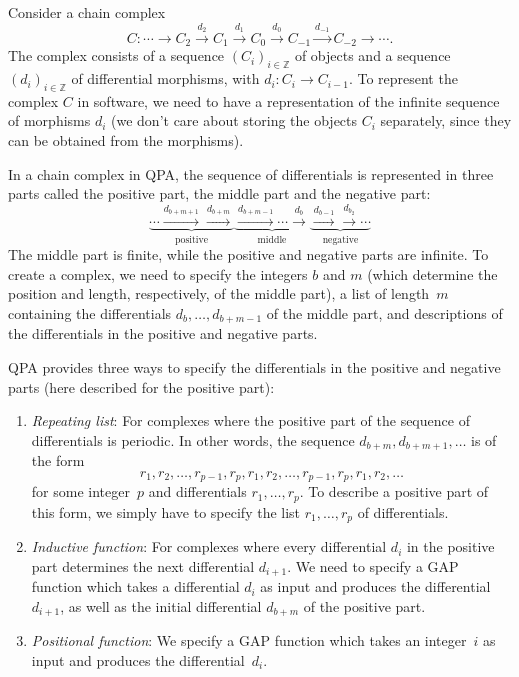 \documentclass{amsart}
\newcommand{\Z}{{\mathbb Z}}
\theoremstyle{definition}
\theoremstyle{theoretic}
\begin{document}
Consider a chain complex
\[
C \colon \cdots \to
 C_2 \xrightarrow{d_2}
 C_1 \xrightarrow{d_1}
 C_0 \xrightarrow{d_0}
 C_{-1} \xrightarrow{d_{-1}}
 C_{-2} \to \cdots.
\]
The complex consists of a sequence $(C_i)_{i \in \Z}$ of objects and a
sequence $(d_i)_{i \in \Z}$ of differential morphisms, with $d_i
\colon C_i \to C_{i-1}$.  To represent the complex $C$ in software, we
need to have a representation of the infinite sequence of morphisms
$d_i$ (we don't care about storing the objects $C_i$ separately, since
they can be obtained from the morphisms).

In a chain complex in QPA, the sequence of differentials is
represented in three parts called the positive part, the middle part
and the negative part:
\begin{equation}
\label{eqn:complex-parts}
\underbrace{\cdots \xrightarrow{d_{b+m+1}} \xrightarrow{d_{b+m}}}_{\text{positive}}
\underbrace{\xrightarrow{d_{b+m-1}} \cdots \xrightarrow{d_b}}_{\text{middle}}
\underbrace{\xrightarrow{d_{b-1}} \xrightarrow{d_{b_2}} \cdots}_{\text{negative}}
\end{equation}
The middle part is finite, while the positive and negative parts are
infinite.  To create a complex, we need to specify the integers $b$
and $m$ (which determine the position and length, respectively, of the
middle part), a list of length~$m$ containing the differentials $d_b,
\ldots, d_{b+m-1}$ of the middle part, and descriptions of the
differentials in the positive and negative parts.

\label{complex-part-types}
QPA provides three ways to specify the differentials in the positive
and negative parts (here described for the positive part):
\begin{enumerate}
\item \emph{Repeating list}: For complexes where the positive part of
the sequence of differentials is periodic.  In other words, the
sequence $d_{b+m}, d_{b+m+1}, \ldots$ is of the form
\[
r_1, r_2, \ldots, r_{p-1}, r_p, r_1, r_2, \ldots, r_{p-1}, r_p, r_1, r_2, \ldots
\]
for some integer~$p$ and differentials $r_1, \ldots, r_p$.  To
describe a positive part of this form, we simply have to specify the
list $r_1, \ldots, r_p$ of differentials.
\item \emph{Inductive function}: For complexes where every
differential $d_i$ in the positive part determines the next
differential $d_{i+1}$.  We need to specify a GAP function which takes
a differential $d_i$ as input and produces the differential $d_{i+1}$,
as well as the initial differential $d_{b+m}$ of the positive part.
\item \emph{Positional function}: We specify a GAP function which
takes an integer~$i$ as input and produces the differential~$d_i$.
\end{enumerate}
\end{document}
